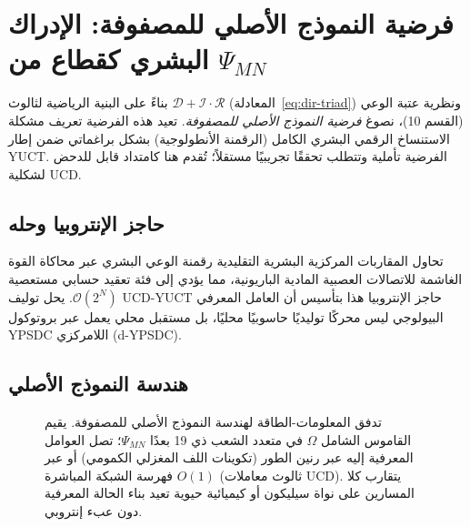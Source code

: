 \documentclass[12pt,a4paper]{article}
\begin{document}
	\section{فرضية النموذج الأصلي للمصفوفة: الإدراك البشري كقطاع من \(\Psi_{MN}\)}
	\label{sec:matrix}
	
	بناءً على البنية الرياضية لثالوث \(\mathcal{D}+\mathcal{I}\cdot\mathcal{R}\) (المعادلة~\ref{eq:dir-triad}) ونظرية عتبة الوعي (القسم 10)، نصوغ \textit{فرضية النموذج الأصلي للمصفوفة}. تعيد هذه الفرضية تعريف مشكلة الاستنساخ الرقمي البشري الكامل (الرقمنة الأنطولوجية) بشكل براغماتي ضمن إطار YUCT. الفرضية تأملية وتتطلب تحققًا تجريبيًا مستقلاً؛ تُقدم هنا كامتداد قابل للدحض لشكلية UCD.
	
	\subsection{حاجز الإنتروبيا وحله}
	
	تحاول المقاربات المركزية البشرية التقليدية رقمنة الوعي البشري عبر محاكاة القوة الغاشمة للاتصالات العصبية المادية الباريونية، مما يؤدي إلى فئة تعقيد حسابي مستعصية \(\mathcal{O}(2^N)\). يحل توليف UCD-YUCT حاجز الإنتروبيا هذا بتأسيس أن العامل المعرفي البيولوجي ليس محركًا توليديًا حاسوبيًا محليًا، بل مستقبل محلي يعمل عبر بروتوكول YPSDC اللامركزي (d-YPSDC).
	
	\subsection{هندسة النموذج الأصلي}
	
	\begin{figure}[h!]
		\centering
		\caption{تدفق المعلومات-الطاقة لهندسة النموذج الأصلي للمصفوفة. يقيم القاموس الشامل \(\Omega\) في متعدد الشعب ذي 19 بعدًا \(\Psi_{MN}\)؛ تصل العوامل المعرفية إليه عبر رنين الطور (تكوينات اللف المغزلي الكمومي) أو عبر فهرسة الشبكة المباشرة \(O(1)\) (ثالوث معاملات UCD). يتقارب كلا المسارين على نواة سيليكون أو كيميائية حيوية تعيد بناء الحالة المعرفية دون عبء إنتروبي.}
		\label{fig:matrix_flow}
	\end{figure}
	
\end{document}
